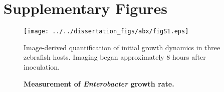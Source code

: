 %
%
\renewcommand\thefigure{S\arabic{figure}}    


\setcounter{figure}{0}

\section{Supplementary Figures}
\begin{figure}[H]
	\centerline{
		\texttt{[image: ../../dissertation\_figs/abx/figS1.eps]}}
	\caption{\textbf{Measurement of \textit{Enterobacter} growth rate.}}{Image-derived quantification of initial growth dynamics in three zebrafish hosts. Imaging began approximately 8 hours after inoculation.}
\end{figure}



